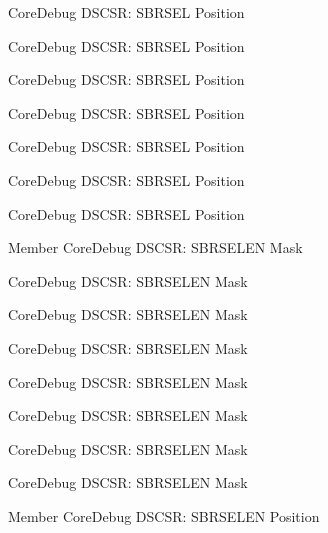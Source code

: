 \begin{DoxyRefList}
\label{deprecated__deprecated000546}%
%
Core\+Debug DSCSR\+: SBRSEL Position 

\label{deprecated__deprecated000367}%
%
Core\+Debug DSCSR\+: SBRSEL Position 

\label{deprecated__deprecated000648}%
%
Core\+Debug DSCSR\+: SBRSEL Position 

\label{deprecated__deprecated000149}%
%
Core\+Debug DSCSR\+: SBRSEL Position 

\label{deprecated__deprecated000095}%
%
Core\+Debug DSCSR\+: SBRSEL Position 

\label{deprecated__deprecated000288}%
%
Core\+Debug DSCSR\+: SBRSEL Position 

\label{deprecated__deprecated000225}%
%
Core\+Debug DSCSR\+: SBRSEL Position  
\item[Member \doxylink{group__CMSIS__SCB_ga5e5ed94cac1139165af161c008881805}{Core\+Debug\+\_\+\+DSCSR\+\_\+\+SBRSELEN\+\_\+\+Msk} ]\label{deprecated__deprecated000098}%
%
Core\+Debug DSCSR\+: SBRSELEN Mask 

\label{deprecated__deprecated000549}%
%
Core\+Debug DSCSR\+: SBRSELEN Mask 

\label{deprecated__deprecated000651}%
%
Core\+Debug DSCSR\+: SBRSELEN Mask 

\label{deprecated__deprecated000152}%
%
Core\+Debug DSCSR\+: SBRSELEN Mask 

\label{deprecated__deprecated000291}%
%
Core\+Debug DSCSR\+: SBRSELEN Mask 

\label{deprecated__deprecated000228}%
%
Core\+Debug DSCSR\+: SBRSELEN Mask 

\label{deprecated__deprecated000446}%
%
Core\+Debug DSCSR\+: SBRSELEN Mask 

\label{deprecated__deprecated000370}%
%
Core\+Debug DSCSR\+: SBRSELEN Mask  
\item[Member \doxylink{group__CMSIS__SCB_ga3eb88e444b678057db1b59272eebb1ad}{Core\+Debug\+\_\+\+DSCSR\+\_\+\+SBRSELEN\+\_\+\+Pos} ]\label{deprecated__deprecated000227}%
%
Core\+Debug DSCSR\+: SBRSELEN Position 


\end{DoxyRefList}
